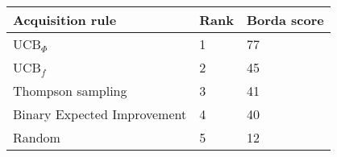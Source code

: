 \begin{tabular}{lll}
Acquisition rule & Rank & Borda score \\ 
\hline 
UCB$_\Phi$                                    & 1 & 77 \\ 
UCB$_f$ \citep{Tesch2013}                     & 2 & 45 \\ 
Thompson sampling                             & 3 & 41 \\ 
Binary Expected Improvement \citep{Tesch2013} & 4 & 40 \\ 
Random                                        & 5 & 12 \\ 
\hline 
\end{tabular}